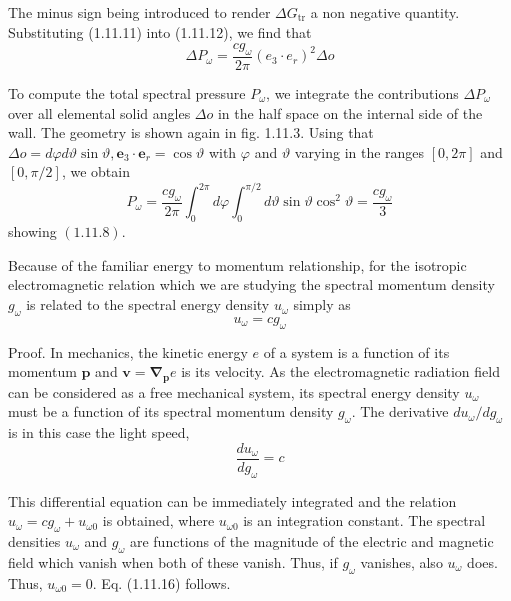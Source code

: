 \documentclass{article}
\begin{document}
The minus sign being introduced to render $\Delta G_{\mathrm{tr}}$ a non negative quantity. Substituting
(1.11.11) into (1.11.12), we find that
$$
\begin{equation*}
\Delta P_{\omega}=\frac{c g_{\omega}}{2 \pi}\left(e_{3} \cdot e_{r}\right)^{2} \Delta o \tag{1.11.14}
\end{equation*}
$$

To compute the total spectral pressure $P_{\omega}$, we integrate the contributions $\Delta P_{\omega}$ over all elemental solid angles $\Delta o$ in the half space on the internal side of the wall. The geometry is shown again in fig. 1.11.3. Using that $\Delta o=d \varphi d \vartheta \sin \vartheta, \boldsymbol{e}_{3} \cdot \boldsymbol{e}_{r}=\cos \vartheta$ with $\varphi$ and $\vartheta$ varying in the ranges $[0,2 \pi]$ and $[0, \pi / 2]$, we obtain
$$
\begin{equation*}
P_{\omega}=\frac{c g_{\omega}}{2 \pi} \int_{0}^{2 \pi} d \varphi \int_{0}^{\pi / 2} d \vartheta \sin \vartheta \cos ^{2} \vartheta=\frac{c g_{\omega}}{3} \tag{1.11.15}
\end{equation*}
$$
showing $(1.11 .8)$.

Because of the familiar energy to momentum relationship, for the isotropic electromagnetic relation which we are studying the spectral momentum density $g_{\omega}$ is related to the spectral energy density $u_{\omega}$ simply as
$$
\begin{equation*}
u_{\omega}=c g_{\omega} \tag{1.11.16}
\end{equation*}
$$

Proof. In mechanics, the kinetic energy $e$ of a system is a function of its momentum $\boldsymbol{p}$ and $\boldsymbol{v}=\boldsymbol{\nabla}_{\boldsymbol{p}} e$ is its velocity. As the electromagnetic radiation field can be considered as a free mechanical system, its spectral energy density $u_{\omega}$ must be a function of its spectral momentum density $g_{\omega}$. The derivative $d u_{\omega} / d g_{\omega}$ is in this case the light speed,
$$
\begin{equation*}
\frac{d u_{\omega}}{d g_{\omega}}=c \tag{1.11.17}
\end{equation*}
$$

This differential equation can be immediately integrated and the relation $u_{\omega}=c g_{\omega}+u_{\omega 0}$ is obtained, where $u_{\omega 0}$ is an integration constant. The spectral densities $u_{\omega}$ and $g_{\omega}$ are functions of the magnitude of the electric and magnetic field which vanish when both of these vanish. Thus, if $g_{\omega}$ vanishes, also $u_{\omega}$ does. Thus, $u_{\omega 0}=0$. Eq. (1.11.16) follows.
\end{document}
